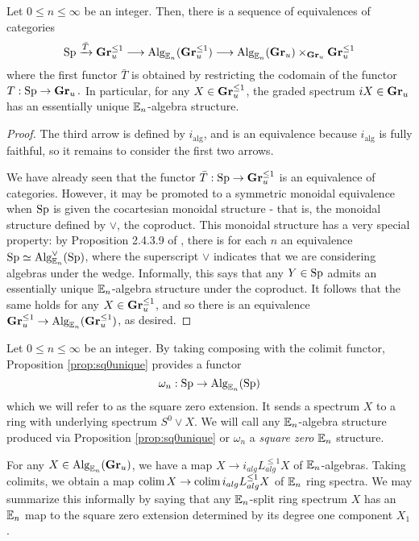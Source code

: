 \begin{prop}\label{prop:sq0unique}
Let $0\leq n\leq \infty$ be an integer.  Then, there is a sequence of equivalences of categories $$\operatorname{\text{Sp}} \xrightarrow{\bar{T}} \operatorname{\textbf{Gr}}_u^{\leq 1} \longrightarrow \operatorname{\text{Alg}}_{\operatorname{\mathbb{E}}_n}(\operatorname{\textbf{Gr}}_u^{\leq 1}) \longrightarrow  \operatorname{\text{Alg}}_{\operatorname{\mathbb{E}}_n}( \operatorname{\textbf{Gr}}_u) \times_{\operatorname{\textbf{Gr}}_u} \operatorname{\textbf{Gr}}^{\leq 1}_u $$ where the first functor $\bar{T}$ is obtained by restricting the codomain of the functor $T:\operatorname{\text{Sp}} \to \operatorname{\textbf{Gr}}_u.$  In particular, for any $X\in \operatorname{\textbf{Gr}}_u^{\leq 1}$, the graded spectrum $iX\in \operatorname{\textbf{Gr}}_u$ has an essentially unique $\operatorname{\mathbb{E}}_n$-algebra structure.  
\end{prop}
\begin{proof}
The third arrow is defined by $i_{\text{alg}}$, and is an equivalence because $i_{\text{alg}}$ is fully faithful, so it remains to consider the first two arrows.  

We have already seen that the functor $\bar{T}: \operatorname{\text{Sp}} \to \operatorname{\textbf{Gr}}^{\leq 1}_u$ is an equivalence of categories.  However, it may be promoted to a symmetric monoidal equivalence when $\operatorname{\text{Sp}}$ is given the cocartesian monoidal structure - that is, the monoidal structure defined by $\vee$, the coproduct.  This monoidal structure has a very special property: by Proposition 2.4.3.9 of \cite{HA}, there is for each $n$ an equivalence $\operatorname{\text{Sp}} \simeq \operatorname{\text{Alg}}^{\vee}_{\operatorname{\mathbb{E}}_n}(\operatorname{\text{Sp}})$, where the superscript $\vee$ indicates that we are considering algebras under the wedge.  Informally, this says that any $Y\in \operatorname{\text{Sp}}$ admits an essentially unique $\operatorname{\mathbb{E}}_n$-algebra structure under the coproduct.  It follows that the same holds for any $X\in \operatorname{\textbf{Gr}}^{\leq 1}_u$, and so there is an equivalence $\operatorname{\textbf{Gr}}^{\leq 1}_u \to \operatorname{\text{Alg}}_{\operatorname{\mathbb{E}}_n}(\operatorname{\textbf{Gr}}^{\leq 1}_u)$, as desired.    
\end{proof}


\begin{term}
Let $0\leq n\leq \infty$ be an integer.  By taking composing with the colimit functor, Proposition \ref{prop:sq0unique} provides a functor $$\omega_n: \operatorname{\text{Sp}} \to \operatorname{\text{Alg}}_{\operatorname{\mathbb{E}}_n}(\operatorname{\text{Sp}})$$ which we will refer to as the square zero extension.  It sends a spectrum $X$ to a ring with underlying spectrum $S^0\vee X$.  We will call any $\operatorname{\mathbb{E}}_n$-algebra structure produced via Proposition \ref{prop:sq0unique} or $\omega_n$ a \emph{square zero} $\operatorname{\mathbb{E}}_n$ structure.  
\end{term}

\begin{rmk} \label{rmk:maptosq0}
For any $X\in \operatorname{\text{Alg}}_{\operatorname{\mathbb{E}}_n}(\operatorname{\textbf{Gr}}_u)$, we have a map $X\to i_{alg}L^{\leq 1}_{alg}X$ of $\operatorname{\mathbb{E}}_n$-algebras.  Taking colimits, we obtain a map $\operatorname*{\text{colim}} X \to \operatorname*{\text{colim}} i_{alg}L^{\leq 1}_{alg}X$ of $\operatorname{\mathbb{E}}_n$ ring spectra.
 We may summarize this informally by saying that any $\operatorname{\mathbb{E}}_n$-split ring spectrum $X$ has an $\operatorname{\mathbb{E}}_n$ map to the square zero extension determined by its degree one component $X_1$.  
 \end{rmk}

